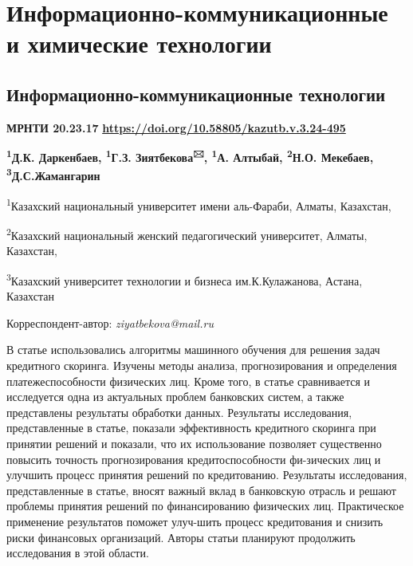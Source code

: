 \let\cleardoublepage\clearpage
\part{Информационно-коммуникационные и химические технологии}
\chapter{Информационно-коммуникационные технологии}
{\bfseries МРНТИ 20.23.17}
\hfill {\bfseries \href{https://doi.org/10.58805/kazutb.v.3.24-495}{https://doi.org/10.58805/kazutb.v.3.24-495}}



\begin{center}
{\bfseries \textsuperscript{1}Д.К. Даркенбаев, \textsuperscript{1}Г.З.
Зиятбекова\textsuperscript{🖂}, \textsuperscript{1}А. Алтыбай,
\textsuperscript{2}Н.О. Мекебаев, \textsuperscript{3}Д.С.Жамангарин}

\textsuperscript{1}Казахский национальный университет имени аль-Фараби,
Алматы, Казахстан,

\textsuperscript{2}Казахский национальный женский педагогический
университет, Алматы, Казахстан,

\textsuperscript{3}Казахский университет технологии и бизнеса им.К.Кулажанова, Астана,
Казахстан
\end{center}
Корреспондент-автор: \emph{ziyatbekova@mail.ru} \vspace{0.5cm}

В статье использовались алгоритмы машинного обучения для решения задач
кредитного скоринга. Изучены методы анализа, прогнозирования и
определения платежеспособности физических лиц. Кроме того, в статье
сравнивается и исследуется одна из актуальных проблем банковских систем,
а также представлены результаты обработки данных. Результаты
исследования, представленные в статье, показали эффективность кредитного
скоринга при принятии решений и показали, что их использование позволяет
существенно повысить точность прогнозирования кредитоспособности
фи-зических лиц и улучшить процесс принятия решений по кредитованию.
Результаты исследования, представленные в статье, вносят важный вклад в
банковскую отрасль и решают проблемы принятия решений по финансированию
физических лиц. Практическое применение результатов поможет улуч-шить
процесс кредитования и снизить риски финансовых организаций. Авторы
статьи планируют продолжить исследования в этой области.


